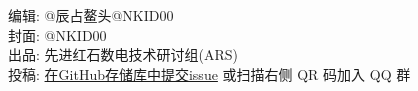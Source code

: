 \documentclass[UTF8,12pt,punct=kaiming,fontset=none]{ctexart}
\begin{document}
\vspace{2cm}

\noindent
\sffamily 编辑: \hspace{0.2cm}\normalfont @辰占鳌头\hspace{0.5cm}@NKID00 \\
\sffamily 封面: \hspace{0.2cm}\normalfont @NKID00 \\
\sffamily 出品: \hspace{0.2cm}\normalfont 先进红石数电技术研讨组(ARS) \\
\sffamily 投稿: \hspace{0.2cm}\normalfont \href{https://github.com/ARS-MC/RRDC/issues/new?assignees=&labels=%E6%8A%95%E7%A8%BF&template=contribute.md&title=%E5%9C%A8%E6%AD%A4%E5%A4%84%E5%A1%AB%E5%86%99%E6%A0%87%E9%A2%98}{在GitHub存储库中提交issue} 或扫描右侧 QR 码加入 QQ 群
\end{document}
